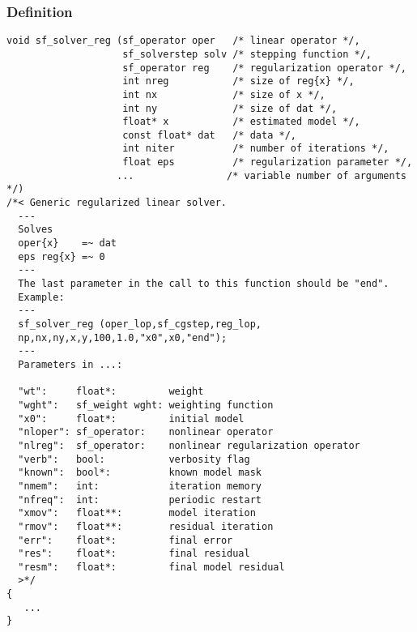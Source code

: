 \subsubsection*{Definition}
\begin{verbatim}
void sf_solver_reg (sf_operator oper   /* linear operator */, 
                    sf_solverstep solv /* stepping function */,
                    sf_operator reg    /* regularization operator */, 
                    int nreg           /* size of reg{x} */, 
                    int nx             /* size of x */, 
                    int ny             /* size of dat */, 
                    float* x           /* estimated model */, 
                    const float* dat   /* data */, 
                    int niter          /* number of iterations */, 
                    float eps          /* regularization parameter */, 
                   ...                /* variable number of arguments */) 
/*< Generic regularized linear solver.
  ---
  Solves
  oper{x}    =~ dat
  eps reg{x} =~ 0
  ---
  The last parameter in the call to this function should be "end".
  Example: 
  ---
  sf_solver_reg (oper_lop,sf_cgstep,reg_lop,
  np,nx,ny,x,y,100,1.0,"x0",x0,"end");
  ---
  Parameters in ...:
  
  "wt":     float*:         weight      
  "wght":   sf_weight wght: weighting function
  "x0":     float*:         initial model
  "nloper": sf_operator:    nonlinear operator  
  "nlreg":  sf_operator:    nonlinear regularization operator
  "verb":   bool:           verbosity flag
  "known":  bool*:          known model mask
  "nmem":   int:            iteration memory
  "nfreq":  int:            periodic restart
  "xmov":   float**:        model iteration
  "rmov":   float**:        residual iteration
  "err":    float*:         final error
  "res":    float*:         final residual
  "resm":   float*:         final model residual
  >*/
{
   ...
}
\end{verbatim}

